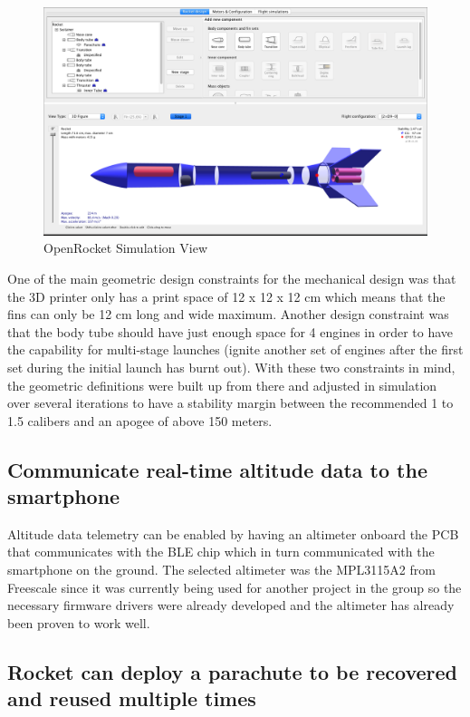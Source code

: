 \documentclass{workreport}
\begin{document}
\begin{body}
	\begin{figure}[!ht]
		\centering
		\includegraphics[width=14cm]{./images/openrocket.png}
		\caption{OpenRocket Simulation View}
		\label{fig:openrocket}
	\end{figure}

	One of the main geometric design constraints for the mechanical design was that the 3D printer only has a print space of 12 x 12 x 12 cm which means that the fins can only be 12 cm long and wide maximum. Another design constraint was that the body tube should have just enough space for 4 engines in order to have the capability for multi-stage launches (ignite another set of engines after the first set during the initial launch has burnt out). With these two constraints in mind, the geometric definitions were built up from there and adjusted in simulation over several iterations to have a stability margin between the recommended 1 to 1.5 calibers and an apogee of above 150 meters.

	\subsection{Communicate real-time altitude data to the smartphone}
		Altitude data telemetry can be enabled by having an altimeter onboard the PCB that communicates with the BLE chip which in turn communicated with the smartphone on the ground. The selected altimeter was the MPL3115A2 from Freescale since it was currently being used for another project in the group so the necessary firmware drivers were already developed and the altimeter has already been proven to work well.

	\subsection{Rocket can deploy a parachute to be recovered and reused multiple times}




\end{body}
\end{document}
